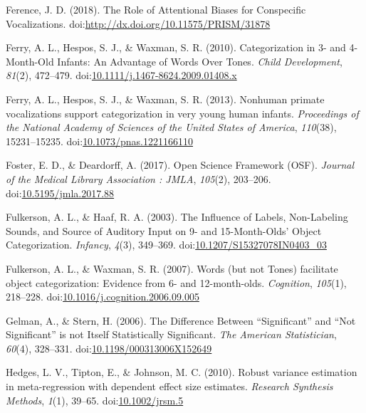 \documentclass[man]{apa6}
\begin{document}
\hypertarget{ref-ference_role_2018}{}
Ference, J. D. (2018). The Role of Attentional Biases for Conspecific
Vocalizations.
doi:\href{https://doi.org/http://dx.doi.org/10.11575/PRISM/31878}{http://dx.doi.org/10.11575/PRISM/31878}

\hypertarget{ref-ferry_categorization_2010}{}
Ferry, A. L., Hespos, S. J., \& Waxman, S. R. (2010). Categorization in
3- and 4-Month-Old Infants: An Advantage of Words Over Tones.
\emph{Child Development}, \emph{81}(2), 472--479.
doi:\href{https://doi.org/10.1111/j.1467-8624.2009.01408.x}{10.1111/j.1467-8624.2009.01408.x}

\hypertarget{ref-ferry_nonhuman_2013}{}
Ferry, A. L., Hespos, S. J., \& Waxman, S. R. (2013). Nonhuman primate
vocalizations support categorization in very young human infants.
\emph{Proceedings of the National Academy of Sciences of the United
States of America}, \emph{110}(38), 15231--15235.
doi:\href{https://doi.org/10.1073/pnas.1221166110}{10.1073/pnas.1221166110}

\hypertarget{ref-foster_open_2017}{}
Foster, E. D., \& Deardorff, A. (2017). Open Science Framework (OSF).
\emph{Journal of the Medical Library Association : JMLA}, \emph{105}(2),
203--206.
doi:\href{https://doi.org/10.5195/jmla.2017.88}{10.5195/jmla.2017.88}

\hypertarget{ref-fulkerson_influence_2003}{}
Fulkerson, A. L., \& Haaf, R. A. (2003). The Influence of Labels,
Non-Labeling Sounds, and Source of Auditory Input on 9- and
15-Month-Olds' Object Categorization. \emph{Infancy}, \emph{4}(3),
349--369.
doi:\href{https://doi.org/10.1207/S15327078IN0403_03}{10.1207/S15327078IN0403\_03}

\hypertarget{ref-fulkerson_words_2007}{}
Fulkerson, A. L., \& Waxman, S. R. (2007). Words (but not Tones)
facilitate object categorization: Evidence from 6- and 12-month-olds.
\emph{Cognition}, \emph{105}(1), 218--228.
doi:\href{https://doi.org/10.1016/j.cognition.2006.09.005}{10.1016/j.cognition.2006.09.005}

\hypertarget{ref-gelman_difference_2006}{}
Gelman, A., \& Stern, H. (2006). The Difference Between ``Significant''
and ``Not Significant'' is not Itself Statistically Significant.
\emph{The American Statistician}, \emph{60}(4), 328--331.
doi:\href{https://doi.org/10.1198/000313006X152649}{10.1198/000313006X152649}

\hypertarget{ref-hedges_robust_2010}{}
Hedges, L. V., Tipton, E., \& Johnson, M. C. (2010). Robust variance
estimation in meta-regression with dependent effect size estimates.
\emph{Research Synthesis Methods}, \emph{1}(1), 39--65.
doi:\href{https://doi.org/10.1002/jrsm.5}{10.1002/jrsm.5}
\end{document}
